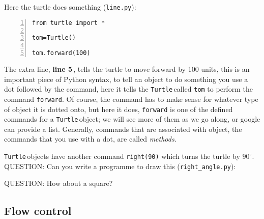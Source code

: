 \documentclass[11pt,a4paper]{scrartcl}
\newcommand{\turtle}{\texttt{Turtle}\,}
\newcommand{\lnn}[1]{\textbf{line #1}\,}
\begin{document}
Here the turtle does something (\texttt{line.py}):
\begin{lstlisting}[numbers=left]
from turtle import *

tom=Turtle()

tom.forward(100)
\end{lstlisting}
The extra line, \lnn{5}, tells the turtle to move forward by 100
units, this is an important piece of Python syntax, to tell an object
to do something you use a dot followed by the command, here it tells
the \turtle called \texttt{tom} to perform the command
\texttt{forward}. Of course, the command has to make sense for
whatever type of object it is dotted onto, but here it does,
\texttt{forward} is one of the defined commands for a \turtle object;
we will see more of them as we go along, or google can provide a
list. Generally, commands that are associated with object, the
commands that you use with a dot, are called \textsl{methods}.
\begin{center}
\end{center}

\turtle objects have another command \texttt{right(90)} which turns the turtle by $90^\circ$. QUESTION: Can you write a programme to draw this (\texttt{right\_angle.py}):
\begin{center}
\end{center}
QUESTION: How about a square?
\begin{center}
\end{center}

\subsection*{Flow control}
\end{document}
